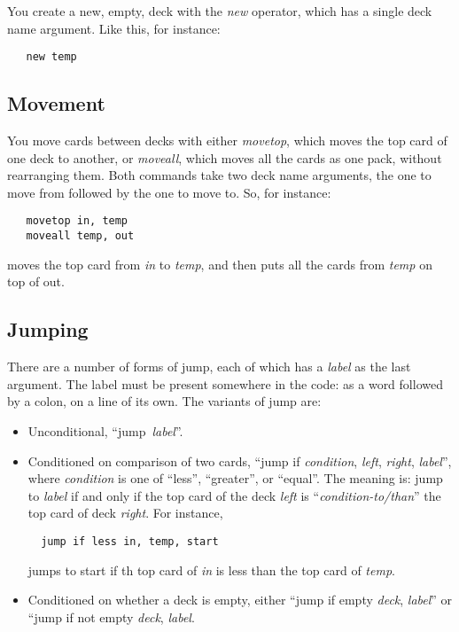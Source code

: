\documentclass[a4paper,twoside]{tufte-handout}
\begin{document}
You create a new, empty, deck with the \emph{new} operator, which has
a single deck name argument. Like this, for instance:
\begin{lstlisting}
   new temp
\end{lstlisting}

\subsection{Movement}\label{sec-move}

You move cards between decks with either \emph{movetop}, which moves
the top card of one deck to another, or \emph{moveall}, which moves
all the cards as one pack, without rearranging them. Both
commands take two deck name arguments, the one to move from followed
by the one to move to. So, for instance:
\begin{lstlisting}
   movetop in, temp
   moveall temp, out
\end{lstlisting}
moves the top card from \emph{in} to \emph{temp}, and then puts all
the cards from \emph{temp} on top of out.

\subsection{Jumping}\label{sec-}

There are a number of forms of jump, each of which has a \emph{label}
as the last argument. The label must be present somewhere in the code:
as a word followed by a colon, on a line of its own. The variants of
jump are:
\begin{itemize}
\item Unconditional, ``jump~\emph{label}''.
\item Conditioned on comparison of two cards,
``jump if \emph{condition}, \emph{left}, \emph{right}, \emph{label}'',
where \emph{condition} is one of ``less'', ``greater'', or
``equal''. The meaning is: jump to \emph{label} if and only if the top
card of the deck \emph{left} is ``\emph{condition-to/than}'' the top card
of deck \emph{right}. For instance,
\begin{lstlisting}
  jump if less in, temp, start
\end{lstlisting}
jumps to start if th top card of \emph{in} is less than the top card
of \emph{temp}.

\item Conditioned on whether a deck is empty, either ``jump if
  empty \emph{deck}, \emph{label}'' or ``jump if not empty \emph{deck},
  \emph{label}.
\end{itemize}
\end{document}
